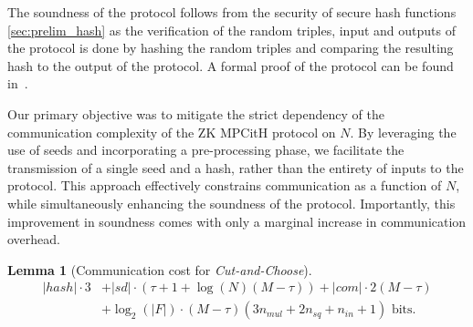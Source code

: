 \documentclass[11pt]{report}
\theoremstyle{definition}
\theoremstyle{plain}
\newtheorem{lemma}{Lemma}[section]
\begin{document}
The soundness of the protocol follows from the security of secure hash functions \autoref{sec:prelim_hash} as the verification of the random triples, input and outputs of the protocol is done by hashing the random triples and comparing the resulting hash to the output of the protocol. A formal proof of the protocol can be found in~\cite[p9]{baum2020concretely}.

Our primary objective was to mitigate the strict dependency of the communication complexity of the ZK MPCitH protocol on $N$. By leveraging the use of seeds and incorporating a pre-processing phase, we facilitate the transmission of a single seed and a hash, rather than the entirety of inputs to the protocol. This approach effectively constrains communication as a function of $N$, while simultaneously enhancing the soundness of the protocol. Importantly, this improvement in soundness comes with only a marginal increase in communication overhead.

\begin{lemma}[Communication cost for \textit{Cut-and-Choose}]
  \begin{align*}
    |hash| \cdot 3 & + |sd| \cdot (\tau + 1 + \log(N) (M - \tau )) + |com| \cdot 2(M - \tau )      \\
                   & + \log_2(|F|) \cdot (M - \tau )(3n_{mul} + 2n_{sq} + n_{in} + 1)\text{ bits.}
  \end{align*}
\end{lemma}


\end{document}
